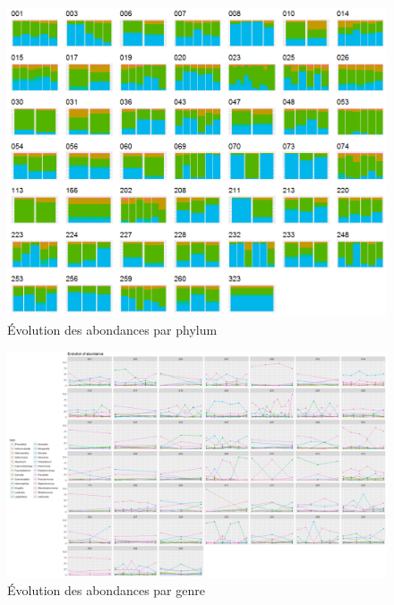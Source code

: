 \documentclass[12pt,a4paper]{article}
\begin{document}
\begin{figure}
\begin{center}
\includegraphics[scale=0.70]{img/enfin_barplot_phylum_norm.png}\hfill
\end{center}
\caption{Évolution des abondances par phylum}
\label{plotabundancephylum}
\end{figure}


\begin{figure}
\begin{center}
\includegraphics[scale=0.50,angle=90]{img/evolution_abundance.png}\hfill
\end{center}
\caption{Évolution des abondances par genre}
\label{plotabundancecurve}
\end{figure}
\end{document}
